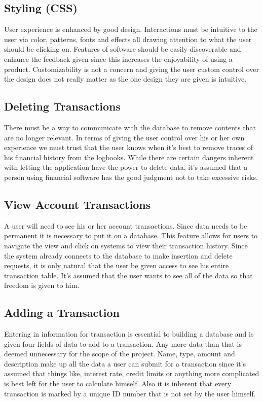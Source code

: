 \documentclass[12pt]{article}
\begin{document}
\subsection{Styling (CSS)}
	User experience is enhanced by good design. Interactions must be intuitive to the user via color, patterns, fonts and effects all drawing attention to what the user should be clicking on. Features of software should be easily discoverable and enhance the feedback given since this increases the enjoyability of using a product. Customizability is not a concern and giving the user custom control over the design does not really matter as the one design they are given is intuitive.
\subsection{Deleting Transactions}
	There must be a way to communicate with the database to remove contents that are no longer relevant. In terms of giving the user control over his or her own experience we must trust that the user knows when it's best to remove traces of his financial history from the logbooks. While there are certain dangers inherent with letting the application have the power to delete data, it's assumed that a person using financial software has the good judgment not to take excessive risks.
\subsection{View Account Transactions}
	A user will need to see his or her account transactions. Since data needs to be permanent it is necessary to put it on a database. This feature allows for users to navigate the view and click on systems to view their transaction history. Since the system already connects to the database to make insertion and delete requests, it is only natural that the user be given access to see his entire transaction table. It's assumed that the user wants to see all of the data so that freedom is given to him.
\subsection{Adding a Transaction}
	Entering in information for transaction is essential to building a database and is given four fields of data to add to a transaction. Any more data than that is deemed unnecessary for the scope of the project. Name, type, amount and description make up all the data a user can submit for a transaction since it's assumed that things like, interest rate, credit limits or anything more complicated is best left for the user to calculate himself. Also it is inherent that every transaction is marked by a unique ID number that is not set by the user himself.
\end{document}

